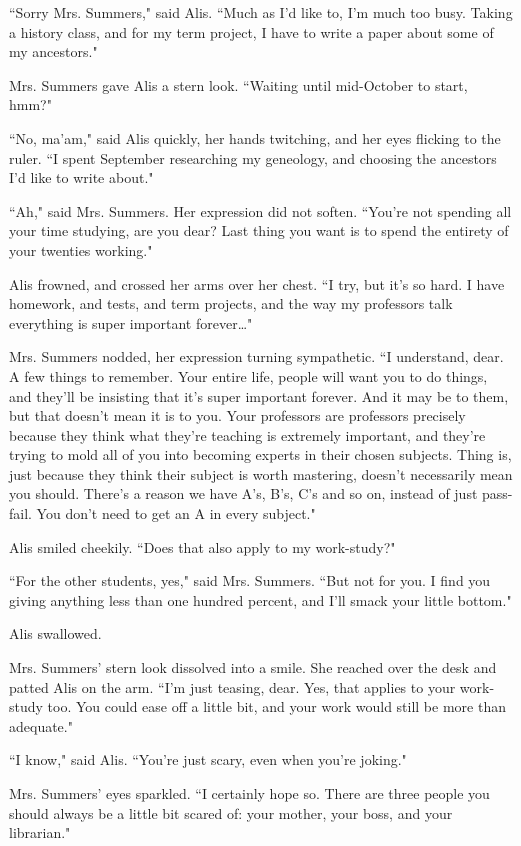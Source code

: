 \documentclass{report}
\begin{document}
``Sorry Mrs. Summers," said Alis. ``Much as I'd like to, I'm much too busy. Taking a history class, and for my term project, I have to write a paper about some of
my ancestors."

Mrs. Summers gave Alis a stern look. ``Waiting until mid-October to start, hmm?"

``No, ma'am," said Alis quickly, her hands twitching, and her eyes flicking to the ruler. ``I spent September researching my geneology, and choosing the ancestors I'd
like to write about."

``Ah," said Mrs. Summers. Her expression did not soften. ``You're not spending all your time studying, are you dear? Last thing you want is to spend the entirety of 
your twenties working."

Alis frowned, and crossed her arms over her chest. ``I try, but it's so hard. I have homework, and tests, and term projects, and the way my professors talk everything is
super important forever\ldots"

Mrs. Summers nodded, her expression turning sympathetic. ``I understand, dear. A few things to remember. Your entire life, people will want you to do things, and they'll
be insisting that it's super important forever. And it may be to them, but that doesn't mean it is to you. Your professors are professors precisely because they think what
they're teaching is extremely important, and they're trying to mold all of you into becoming experts in their chosen subjects. Thing is, just because they think their subject
is worth mastering, doesn't necessarily mean you should. There's a reason we have
A's, B's, C's and so on, instead of just pass-fail. You don't need to get an A in every subject."

Alis smiled cheekily. ``Does that also apply to my work-study?"

``For the other students, yes," said Mrs. Summers. ``But not for you. I find you giving anything less than one hundred percent, and I'll smack your little bottom."

Alis swallowed.

Mrs. Summers' stern look dissolved into a smile. She reached over the desk and patted Alis on the arm. ``I'm just teasing, dear. Yes, that applies to your work-study too. 
You could ease off a little bit, and your work would still be more than adequate."

``I know," said Alis. ``You're just scary, even when you're joking."

Mrs. Summers' eyes sparkled. ``I certainly hope so. There are three people you should always be a little bit scared of: your mother, your boss, and your librarian."
\end{document}

